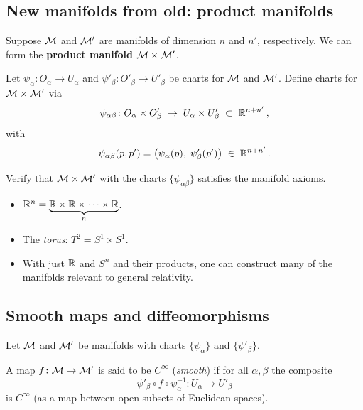 \subsection{New manifolds from old: product manifolds}

Suppose $\mathcal{M}$ and $\mathcal{M}'$ are manifolds of dimension $n$ and $n'$,
respectively.  We can form the \textbf{product manifold}
$\mathcal{M}\times\mathcal{M}'$.

Let $\psi_\alpha\colon O_\alpha\to U_\alpha$ and
$\psi'_\beta\colon O'_\beta\to U'_\beta$ be charts for $\mathcal{M}$ and
$\mathcal{M}'$.  Define charts for $\mathcal{M}\times\mathcal{M}'$ via
\[
  \psi_{\alpha\beta}\colon O_\alpha\times O'_\beta
    \;\to\; U_\alpha\times U'_\beta
    \;\subset\; \mathbb{R}^{n+n'}\,,
\]
with
\begin{equation}\label{eq:product-chart}
  \psi_{\alpha\beta}(p,p')
    = \bigl(\psi_\alpha(p),\;\psi'_\beta(p')\bigr)
    \;\in\; \mathbb{R}^{n+n'}\,.
\end{equation}

\begin{exercise}\label{ex:product-manifold}
  Verify that $\mathcal{M}\times\mathcal{M}'$ with the charts
  $\{\psi_{\alpha\beta}\}$ satisfies the manifold axioms.
\end{exercise}

\begin{example}
\leavevmode
\begin{itemize}
  \item $\mathbb{R}^{n} = \underbrace{\mathbb{R}\times\mathbb{R}\times\cdots\times\mathbb{R}}_{n}$.
  \item The \emph{torus}: $T^2 = S^1\times S^1$.
  \item With just $\mathbb{R}$ and $S^n$ and their products, one can
    construct many of the manifolds relevant to general relativity.
\end{itemize}
\end{example}

\subsection{Smooth maps and diffeomorphisms}

Let $\mathcal{M}$ and $\mathcal{M}'$ be manifolds with charts $\{\psi_\alpha\}$ and
$\{\psi'_\beta\}$.

\begin{definition}\label{def:smooth-map}
  A map $f\colon\mathcal{M}\to\mathcal{M}'$ is said to be $C^\infty$ (\emph{smooth})
  if for all $\alpha,\beta$ the composite
  \[
    \psi'_\beta\circ f\circ\psi_\alpha^{-1}
      \colon U_\alpha \to U'_\beta
  \]
  is $C^\infty$ (as a map between open subsets of Euclidean spaces).
\end{definition}

